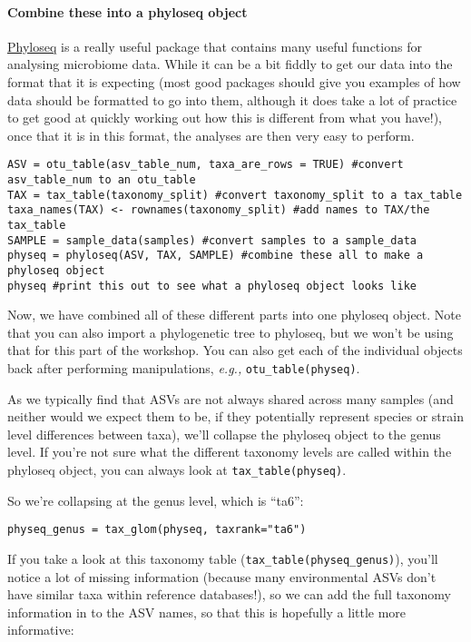 \documentclass[
]{book}
\begin{document}
\paragraph{Combine these into a phyloseq object}\label{combine-these-into-a-phyloseq-object-1}

\href{https://joey711.github.io/phyloseq/}{Phyloseq} is a really useful package that contains many useful functions for analysing microbiome data. While it can be a bit fiddly to get our data into the format that it is expecting (most good packages should give you examples of how data should be formatted to go into them, although it does take a lot of practice to get good at quickly working out how this is different from what you have!), once that it is in this format, the analyses are then very easy to perform.

\begin{verbatim}
ASV = otu_table(asv_table_num, taxa_are_rows = TRUE) #convert asv_table_num to an otu_table
TAX = tax_table(taxonomy_split) #convert taxonomy_split to a tax_table
taxa_names(TAX) <- rownames(taxonomy_split) #add names to TAX/the tax_table
SAMPLE = sample_data(samples) #convert samples to a sample_data
physeq = phyloseq(ASV, TAX, SAMPLE) #combine these all to make a phyloseq object
physeq #print this out to see what a phyloseq object looks like
\end{verbatim}

Now, we have combined all of these different parts into one phyloseq object. Note that you can also import a phylogenetic tree to phyloseq, but we won't be using that for this part of the workshop. You can also get each of the individual objects back after performing manipulations, \emph{e.g.,} \texttt{otu\_table(physeq)}.

As we typically find that ASVs are not always shared across many samples (and neither would we expect them to be, if they potentially represent species or strain level differences between taxa), we'll collapse the phyloseq object to the genus level. If you're not sure what the different taxonomy levels are called within the phyloseq object, you can always look at \texttt{tax\_table(physeq)}.

So we're collapsing at the genus level, which is ``ta6'':

\begin{verbatim}
physeq_genus = tax_glom(physeq, taxrank="ta6")
\end{verbatim}

If you take a look at this taxonomy table (\texttt{tax\_table(physeq\_genus)}), you'll notice a lot of missing information (because many environmental ASVs don't have similar taxa within reference databases!), so we can add the full taxonomy information in to the ASV names, so that this is hopefully a little more informative:
\end{document}
